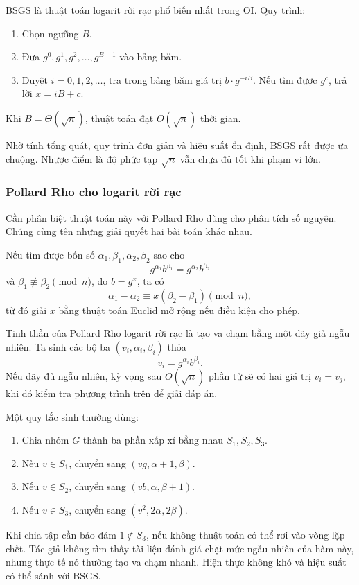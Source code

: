 \documentclass[11pt]{article}
\begin{document}
BSGS là thuật toán logarit rời rạc phổ biến nhất trong OI. Quy trình:
\begin{enumerate}
  \item Chọn ngưỡng \(B\).
  \item Đưa \(g^0,g^1,g^2,\ldots,g^{B-1}\) vào bảng băm.
  \item Duyệt \(i=0,1,2,\ldots\), tra trong bảng băm giá trị \(b\cdot g^{-iB}\).
  Nếu tìm được \(g^c\), trả lời \(x=iB+c\).
\end{enumerate}
Khi \(B=\Theta(\sqrt n)\), thuật toán đạt \(O(\sqrt n)\) thời gian.

Nhờ tính tổng quát, quy trình đơn giản và hiệu suất ổn định, BSGS rất được ưa
chuộng. Nhược điểm là độ phức tạp \(\sqrt n\) vẫn chưa đủ tốt khi phạm vi lớn.

\subsubsection{Pollard Rho cho logarit rời rạc}

Cần phân biệt thuật toán này với Pollard Rho dùng cho phân tích số nguyên.
Chúng cùng tên nhưng giải quyết hai bài toán khác nhau.

Nếu tìm được bốn số \(\alpha_1,\beta_1,\alpha_2,\beta_2\) sao cho
\[
  g^{\alpha_1}b^{\beta_1}=g^{\alpha_2}b^{\beta_2}
\]
và \(\beta_1\not\equiv\beta_2\pmod n\), do \(b=g^x\), ta có
\[
  \alpha_1-\alpha_2\equiv x(\beta_2-\beta_1)\pmod n,
\]
từ đó giải \(x\) bằng thuật toán Euclid mở rộng nếu điều kiện cho phép.

Tinh thần của Pollard Rho logarit rời rạc là tạo va chạm bằng một dãy giả
ngẫu nhiên. Ta sinh các bộ ba \((v_i,\alpha_i,\beta_i)\) thỏa
\[
  v_i=g^{\alpha_i}b^{\beta_i}.
\]
Nếu dãy đủ ngẫu nhiên, kỳ vọng sau \(O(\sqrt n)\) phần tử sẽ có hai giá trị
\(v_i=v_j\), khi đó kiểm tra phương trình trên để giải đáp án.

Một quy tắc sinh thường dùng:
\begin{enumerate}
  \item Chia nhóm \(G\) thành ba phần xấp xỉ bằng nhau \(S_1,S_2,S_3\).
  \item Nếu \(v\in S_1\), chuyển sang \((vg,\alpha+1,\beta)\).
  \item Nếu \(v\in S_2\), chuyển sang \((vb,\alpha,\beta+1)\).
  \item Nếu \(v\in S_3\), chuyển sang \((v^2,2\alpha,2\beta)\).
\end{enumerate}
Khi chia tập cần bảo đảm \(1\notin S_3\), nếu không thuật toán có thể rơi vào
vòng lặp chết. Tác giả không tìm thấy tài liệu đánh giá chặt mức ngẫu nhiên
của hàm này, nhưng thực tế nó thường tạo va chạm nhanh. Hiện thực không khó và
hiệu suất có thể sánh với BSGS.
\end{document}
